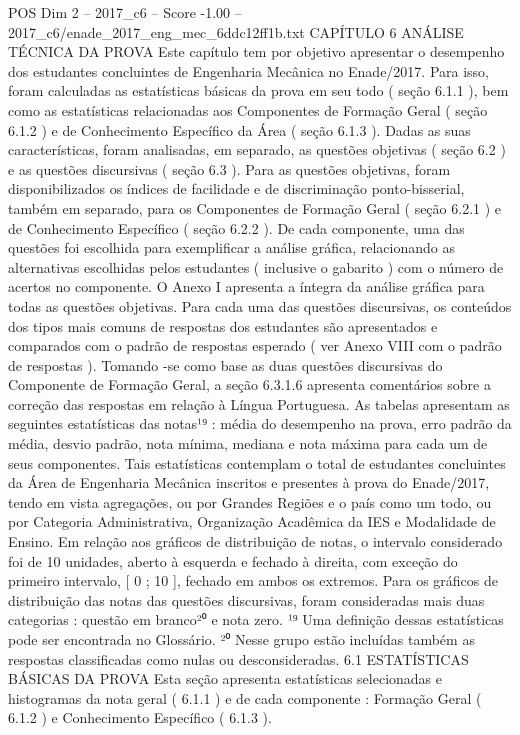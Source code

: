 \begin{textsample}{POS Dim 2 – 2017\_c6 – Score -1.00 – 2017\_c6/enade\_2017\_eng\_mec\_6ddc12ff1b.txt}  \label{ex:f2_pos_270}
CAPÍTULO 6 ANÁLISE TÉCNICA DA PROVA Este capítulo tem por objetivo apresentar o desempenho dos estudantes concluintes de Engenharia Mecânica no Enade/2017.
Para isso, foram calculadas as estatísticas básicas da prova em seu todo ( seção 6.1.1 ), bem como as estatísticas relacionadas aos Componentes de Formação Geral ( seção 6.1.2 ) e de Conhecimento Específico da Área ( seção 6.1.3 ).
Dadas as suas características, foram analisadas, em separado, as questões objetivas ( seção 6.2 ) e as questões discursivas ( seção 6.3 ).
Para as questões objetivas, foram disponibilizados os índices de facilidade e de discriminação ponto-bisserial, também em separado, para os Componentes de Formação Geral ( seção 6.2.1 ) e de Conhecimento Específico ( seção 6.2.2 ).
De cada componente, uma das questões foi escolhida para exemplificar a análise gráfica, relacionando as alternativas escolhidas pelos estudantes ( inclusive o gabarito ) com o número de acertos no componente.
O Anexo I apresenta a íntegra da análise gráfica para todas as questões objetivas.
Para cada uma das questões discursivas, os conteúdos dos tipos mais comuns de respostas dos estudantes são apresentados e comparados com o padrão de respostas esperado ( ver Anexo VIII com o padrão de respostas ).
Tomando -se como base as duas questões discursivas do Componente de Formação Geral, a seção 6.3.1.6 apresenta comentários sobre a correção das respostas em relação à Língua Portuguesa.
As tabelas apresentam as seguintes estatísticas das notas¹⁹ : média do desempenho na prova, erro padrão da média, desvio padrão, nota mínima, mediana e nota máxima para cada um de seus componentes.
Tais estatísticas contemplam o total de estudantes concluintes da Área de Engenharia Mecânica inscritos e presentes à prova do Enade/2017, tendo em vista agregações, ou por Grandes Regiões e o país como um todo, ou por Categoria Administrativa, Organização Acadêmica da IES e Modalidade de Ensino.
Em relação aos gráficos de distribuição de notas, o intervalo considerado foi de 10 unidades, aberto à esquerda e fechado à direita, com exceção do primeiro intervalo, [ 0 ; 10 ], fechado em ambos os extremos.
Para os gráficos de distribuição das notas das questões discursivas, foram consideradas mais duas categorias : questão em branco²⁰ e nota zero. ¹⁹ Uma definição dessas estatísticas pode ser encontrada no Glossário. ²⁰ Nesse grupo estão incluídas também as respostas classificadas como nulas ou desconsideradas. 6.1 ESTATÍSTICAS BÁSICAS DA PROVA Esta seção apresenta estatísticas selecionadas e histogramas da nota geral ( 6.1.1 ) e de cada componente : Formação Geral ( 6.1.2 ) e Conhecimento Específico ( 6.1.3 ).

\end{textsample}

